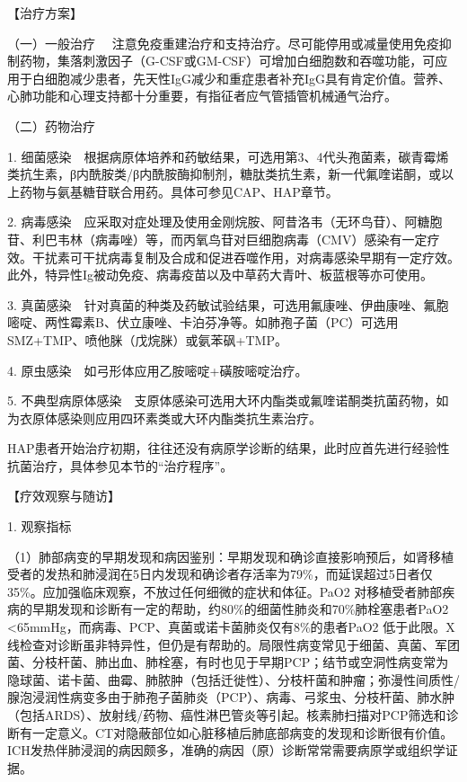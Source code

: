 【治疗方案】

{（一）一般治疗}
　注意免疫重建治疗和支持治疗。尽可能停用或减量使用免疫抑制药物，集落刺激因子（G-CSF或GM-CSF）可增加白细胞数和吞噬功能，可应用于白细胞减少患者，先天性IgG减少和重症患者补充IgG具有肯定价值。营养、心肺功能和心理支持都十分重要，有指征者应气管插管机械通气治疗。

{（二）药物治疗}

1.
细菌感染　根据病原体培养和药敏结果，可选用第3、4代头孢菌素，碳青霉烯类抗生素，β内酰胺类/β内酰胺酶抑制剂，糖肽类抗生素，新一代氟喹诺酮，或以上药物与氨基糖苷联合用药。具体可参见CAP、HAP章节。

2.
病毒感染　应采取对症处理及使用金刚烷胺、阿昔洛韦（无环鸟苷）、阿糖胞苷、利巴韦林（病毒唑）等，而丙氧鸟苷对巨细胞病毒（CMV）感染有一定疗效。干扰素可干扰病毒复制及合成和促进吞噬作用，对病毒感染早期有一定疗效。此外，特异性Ig被动免疫、病毒疫苗以及中草药大青叶、板蓝根等亦可使用。

3.
真菌感染　针对真菌的种类及药敏试验结果，可选用氟康唑、伊曲康唑、氟胞嘧啶、两性霉素B、伏立康唑、卡泊芬净等。如肺孢子菌（PC）可选用SMZ+TMP、喷他脒（戊烷脒）或氨苯砜+TMP。

4. 原虫感染　如弓形体应用乙胺嘧啶+磺胺嘧啶治疗。

5.
不典型病原体感染　支原体感染可选用大环内酯类或氟喹诺酮类抗菌药物，如为衣原体感染则应用四环素类或大环内酯类抗生素治疗。

HAP患者开始治疗初期，往往还没有病原学诊断的结果，此时应首先进行经验性抗菌治疗，具体参见本节的“治疗程序”。

【疗效观察与随访】

1. 观察指标

（1）肺部病变的早期发现和病因鉴别：早期发现和确诊直接影响预后，如肾移植受者的发热和肺浸润在5日内发现和确诊者存活率为79\%，而延误超过5日者仅35\%。应加强临床观察，不放过任何细微的症状和体征。PaO{2}
对移植受者肺部疾病的早期发现和诊断有一定的帮助，约80\%的细菌性肺炎和70\%肺栓塞患者PaO{2}
\textless{}65mmHg，而病毒、PCP、真菌或诺卡菌肺炎仅有8\%的患者PaO{2}
低于此限。X线检查对诊断虽非特异性，但仍是有帮助的。局限性病变常见于细菌、真菌、军团菌、分枝杆菌、肺出血、肺栓塞，有时也见于早期PCP；结节或空洞性病变常为隐球菌、诺卡菌、曲霉、肺脓肿（包括迁徙性）、分枝杆菌和肿瘤；弥漫性间质性/腺泡浸润性病变多由于肺孢子菌肺炎（PCP）、病毒、弓浆虫、分枝杆菌、肺水肿（包括ARDS）、放射线/药物、癌性淋巴管炎等引起。核素肺扫描对PCP筛选和诊断有一定意义。CT对隐蔽部位如心脏移植后肺底部病变的发现和诊断很有价值。ICH发热伴肺浸润的病因颇多，准确的病因（原）诊断常常需要病原学或组织学证据。

